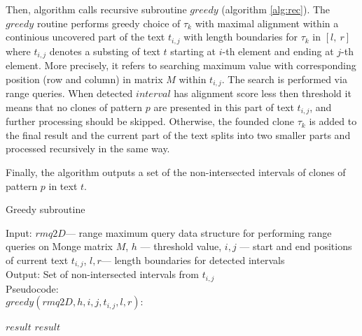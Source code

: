 Then, algorithm calls recursive subroutine $greedy$ (algorithm \ref{alg:rec}).
The $greedy$ routine performs greedy choice of $\tau_{k}$ with maximal alignment within a continious uncovered part of the text $t_{i,j}$ with length boundaries for $\tau_{k}$ in $[l,\ r]$ where $t_{i,j}$ denotes a substing of text $t$ starting at $i$-th element and ending at $j$-th element.
More precisely, it refers to searching maximum value with corresponding position (row and column) in matrix $M$ within $t_{i,j}$.
The search is performed via range queries.
When detected $interval$ has alignment score less then threshold it means that no clones of pattern $p$ are presented in this part of text $t_{i,j}$, and further processing should be skipped.
Otherwise, the founded clone $\tau_k$ is added to the final result and the current part of the text splits into two smaller parts and processed recursively in the same way.

Finally, the algorithm outputs a set of the non-intersected intervals of clones of pattern $p$ in text $t$.


\begin{algorithm}[H]
\caption{Greedy subroutine}
\label{alg:rec}
Input: $rmq2D$--- range maximum query data structure for performing range queries on Monge matrix $M$, $h$ --- threshold value, $i,j$ --- start and end positions of current text $t_{i,j}$, $l,r$--- length boundaries for detected intervals \\
Output: Set of non-intersected intervals from $t_{i,j}$\\
Pseudocode:\\
$greedy(rmq2D,h, i, j, t_{i,j},l,r ):$

\begin{algorithmic}[1]
\RETURN $result$
\ENDIF
{}
\ENDIF
{}
\ENDIF
\RETURN $result$
\end{algorithmic}
\end{algorithm}


